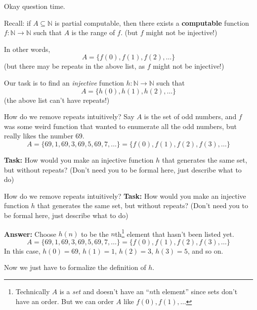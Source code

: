 \documentclass{beamer}
\begin{document}
\begin{frame}{Okay question time.}

Recall: if $A \subseteq \mathbb N$ is partial computable, then there exists a \textbf{computable} function $f: \mathbb N \to \mathbb N$ such that $A$ is the range of $f$. (but $f$ might not be injective!)

\vspace{2mm}

In other words,
$$A = \{f(0), f(1), f(2), \ldots\}$$
(but there may be repeats in the above list, as $f$ might not be injective!)

\vspace{2mm}

Our task is to find an \textit{injective} function $h: \mathbb N \to \mathbb N$ such that
$$A = \{h(0), h(1), h(2), \ldots\}$$
(the above list can't have repeats!)
\end{frame}

\begin{frame}{How do we remove repeats intuitively?}
Say $A$ is the set of odd numbers, and $f$ was some weird function that wanted to enumerate all the odd numbers, but really likes the number $69$.
$$A = \{69, 1, 69, 3, 69, 5, 69, 7, \ldots\} = \{f(0), f(1), f(2), f(3), \ldots\}$$

\textbf{Task:} How would you make an injective function $h$ that generates the same set, but without repeats? (Don't need you to be formal here, just describe what to do)
\end{frame}

\begin{frame}{How do we remove repeats intuitively?}
\textbf{Task:} How would you make an injective function $h$ that generates the same set, but without repeats? (Don't need you to be formal here, just describe what to do)

\vspace{2mm}

\textbf{Answer:} Choose $h(n)$ to be the $n$th\footnote{Technically $A$ is a \textit{set} and doesn't have an ``$n$th element'' since sets don't have an order. But we can order $A$ like $f(0), f(1), \ldots$} element that hasn't been listed yet.
$$A = \{69, 1, 69, 3, 69, 5, 69, 7, \ldots\} = \{f(0), f(1), f(2), f(3), \ldots\}$$
In this case, $h(0) = 69$, $h(1) = 1$, $h(2) = 3$, $h(3) = 5$, and so on. 

\vspace{2mm}

Now we just have to formalize the definition of $h$.
\end{frame}
\end{document}
